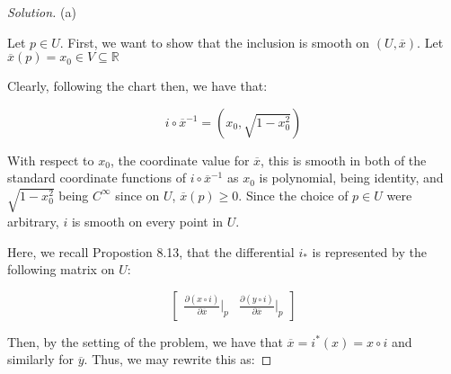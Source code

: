 \documentclass[10pt]{article}
\theoremstyle{nonumberplain}%
\begin{document}
\begin{proof}[Solution]

(a)







Let $p \in U$. First, we want to show that the inclusion is smooth on $(U, \overline{x})$. Let $\overline{x}(p) = x_0 \in V \subseteq \mathbb{R}$

Clearly, following the chart then, we have that:

$$ i \circ \overline{x}^{-1} = \left(x_0, \sqrt{1 - x_0^2} \right) $$

With respect to $x_0$, the coordinate value for $\overline{x}$, this is smooth in both of the standard coordinate functions of $i \circ \overline{x}^{-1}$ as $x_0$ is polynomial, being identity, and $\sqrt{1-x_0^2}$ being $C^\infty$ since on $U$, $\overline{x}(p) \geq 0 $. Since the choice of $p \in U$ were arbitrary, $i$ is smooth on every point in $U$.

Here, we recall Propostion 8.13, that the differential $i_*$ is represented by the following matrix on $U$:

$$\begin{bmatrix} \frac{\partial (x \circ i)}{\partial \overline{x}}\bigg|_p & \frac{\partial (y \circ i)}{\partial \overline{x}}\bigg|_p \end{bmatrix} $$

Then, by the setting of the problem, we have that $\overline{x} = i^*(x) = x \circ i$ and similarly for $\overline{y}$. Thus, we may rewrite this as:


\end{proof}
\end{document}
